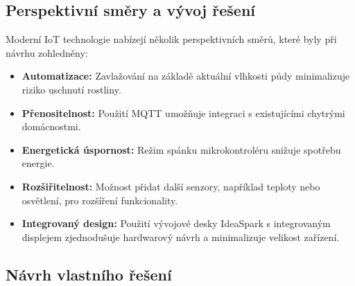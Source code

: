 \documentclass[a4paper, 11pt]{article}
\begin{document}
\subsection{Perspektivní směry a vývoj řešení}

Moderní IoT technologie nabízejí několik perspektivních směrů, které byly při návrhu zohledněny:
\begin{itemize}
    \item \textbf{Automatizace:} Zavlažování na základě aktuální vlhkosti půdy minimalizuje riziko uschnutí rostliny.
    \item \textbf{Přenositelnost:} Použití MQTT umožňuje integraci s existujícími chytrými domácnostmi.
    \item \textbf{Energetická úspornost:} Režim spánku mikrokontroléru snižuje spotřebu energie.
    \item \textbf{Rozšiřitelnost:} Možnost přidat další senzory, například teploty nebo osvětlení, pro rozšíření funkcionality.
    \item \textbf{Integrovaný design:} Použití vývojové desky IdeaSpark s integrovaným displejem zjednodušuje hardwarový návrh a minimalizuje velikost zařízení.
\end{itemize}

\subsection{Návrh vlastního řešení}
\end{document}
